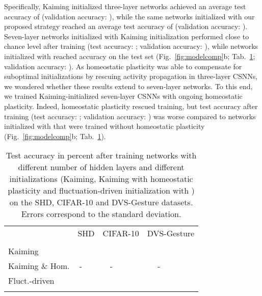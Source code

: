 \documentclass[11pt,a4paper]{article}
\begin{document}
Specifically, Kaiming initialized three-layer networks achieved an average test accuracy of  (validation accuracy: ), while the same networks initialized with our proposed strategy reached an average test accuracy of  (validation accuracy: ).
Seven-layer networks initialized with Kaiming initialization performed close to chance level after training (test accuracy: ; validation accuracy: ), while networks initialized with  reached  accuracy on the test set (Fig.~\ref{fig:modelcomp}b; Tab.~\ref{tab:acc_deep}; validation accuracy: ). 
As homeostatic plasticity was able to compensate for suboptimal initializations by rescuing activity propagation in three-layer \acp{CSNN}, we wondered whether these results extend to seven-layer networks.
To this end, we trained Kaiming-initialized seven-layer \acp{CSNN} with ongoing homeostatic plasticity.
Indeed, homeostatic plasticity rescued training, but test accuracy after training (test accuracy: ; validation accuracy: ) was worse compared to networks initialized with  that were trained without homeostatic plasticity (Fig.~\ref{fig:modelcomp}b; Tab.~\ref{tab:acc_deep}).


\begin{table}[b]
\def\arraystretch{1.4}
\setlength{\tabcolsep}{5pt}
\caption{Test accuracy in percent after training networks with different number of hidden layers and different initializations (Kaiming, Kaiming with homeostatic plasticity and fluctuation-driven initialization with ) on the SHD, CIFAR-10 and DVS-Gesture datasets. Errors correspond to the standard deviation.}
\centering
\begin{tabular*}{\textwidth}{@{\extracolsep{\fill}}lcccccc}
\toprule
& \multicolumn{2}{c}{SHD}
& \multicolumn{2}{c}{CIFAR-10}
& \multicolumn{2}{c}{DVS-Gesture}
 \\
 &  &  &  &  &  & \\
\midrule
Kaiming &   &  &  &  &  &  \\
Kaiming \& Hom. & - &   & - &   & - &  \\
Fluct.-driven &   &   &  &   &   &  \\
\addlinespace
\bottomrule
\end{tabular*}
\label{tab:acc_deep}
\end{table}
\end{document}
